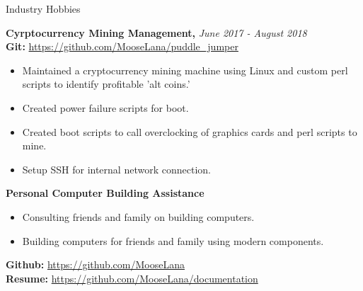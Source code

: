 \documentclass{resume} %
\begin{document}
\newpage


\begin{rSection}{Industry Hobbies} 

{\bf Cyrptocurrency Mining Management, }{\em June 2017 - August 2018} 
\\
{\bf Git: }\url {https://github.com/MooseLana/puddle_jumper}
\begin{itemize}
\item Maintained a cryptocurrency mining machine using Linux and custom perl scripts to identify profitable 'alt coins.'
\item Created power failure scripts for boot.
\item Created boot scripts to call overclocking of graphics cards and perl scripts to mine.
\item Setup SSH for internal network connection.
\end{itemize}

\hfill \break

{\bf Personal Computer Building Assistance}
\begin{itemize}
\item Consulting friends and family on building computers.
\item Building computers for friends and family using modern components.
\end{itemize}

\hfill \break

{\bf Github: }\url{https://github.com/MooseLana}
\\
{\bf Resume: }\url { https://github.com/MooseLana/documentation}
\end{rSection}
\end{document}
